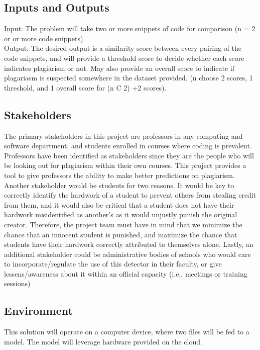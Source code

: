 \documentclass{article}
\begin{document}
\subsection{Inputs and Outputs}
Input: The problem will take two or more snippets of code for comparison (n = 2 or 
or more code snippets). \\
Output: The desired output is a similarity score between every pairing of the
code snippets, and will provide a threshold score to decide whether each score
indicates plagiarism or not. May also provide an overall score to indicate if
plagariasm is suspected somewhere in the dataset provided. (n choose 2 scores, 1
threshold, and 1 overall score for (n C 2) +2 scores). 


\subsection{Stakeholders}
The primary stakeholders in this project are professors in any computing and
software department, and students enrolled in courses where coding is prevalent.
Professors have been identified as stakeholders since they are the people who
will be looking out for plagiarism within their own courses. This project
provides a tool to give professors the ability to make better predictions on
plagiarism. Another stakeholder would be students for two reasons. It would be
key to correctly identify the hardwork of a student to prevent others from
stealing credit from them, and it would also be critical that a student does not
have their hardwork misidentified as another's as it would unjustly punish the
original creator. Therefore, the project team must have in mind that we minimize
the chance that an innocent student is punished, and maximize the chance that
students have their hardwork correctly attributed to themselves alone. Lastly,
an additional stakeholder could be administrative bodies of schools who would
care to incorporate/regulate the use of this detector in their faculty, or give
lessens/awareness about it within an official capacity (i.e., meetings or
training sessions)

\subsection{Environment}
This solution will operate on a computer device, where two files will be fed to 
a model.
The model will leverage hardware provided on the cloud.
\end{document}
